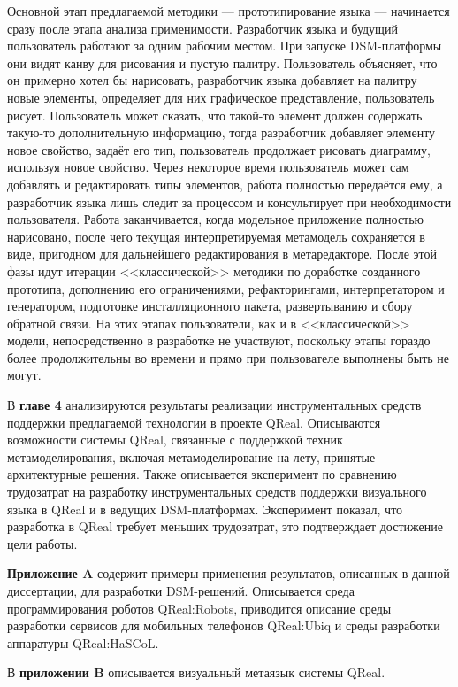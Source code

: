 Основной этап предлагаемой методики --- прототипирование языка --- начинается сразу 
после этапа анализа применимости. Разработчик языка и будущий пользователь работают 
за одним рабочим местом. При запуске DSM-платформы они видят канву для рисования и 
пустую палитру. Пользователь объясняет, что он примерно хотел бы нарисовать, разработчик 
языка добавляет на палитру новые элементы, определяет для них графическое представление, 
пользователь рисует. Пользователь может сказать, что такой-то элемент должен содержать 
такую-то дополнительную информацию, тогда разработчик добавляет элементу новое свойство, 
задаёт его тип, пользователь продолжает рисовать диаграмму, используя новое свойство. 
Через некоторое время пользователь может сам добавлять и 
редактировать типы элементов, работа полностью передаётся ему, а разработчик языка 
лишь следит за процессом и консультирует при необходимости пользователя. Работа заканчивается, 
когда модельное приложение полностью нарисовано, после чего текущая интерпретируемая 
метамодель сохраняется в виде, пригодном для дальнейшего редактирования в метаредакторе. 
После этой фазы идут итерации <<классической>> методики по доработке созданного 
прототипа, дополнению его ограничениями, рефакторингами, интерпретатором и генератором, 
подготовке инсталляционного пакета, развертыванию и сбору обратной связи. На этих этапах 
пользователи, как и в <<классической>> модели, непосредственно в разработке не участвуют, 
поскольку этапы гораздо более продолжительны во времени и прямо при пользователе выполнены 
быть не могут.

В \textbf{главе 4} анализируются результаты реализации инструментальных средств поддержки предлагаемой 
технологии в проекте QReal. Описываются возможности системы QReal, связанные с поддержкой 
техник метамоделирования, включая метамоделирование на лету, принятые архитектурные 
решения. Также описывается эксперимент по сравнению трудозатрат на разработку инструментальных
средств поддержки визуального языка в QReal и в ведущих DSM-платформах. Эксперимент 
показал, что разработка в QReal требует меньших трудозатрат, это подтверждает достижение цели работы.

\textbf{Приложение A} содержит примеры применения результатов, описанных в данной 
диссертации, для разработки DSM-решений. Описывается среда программирования роботов 
QReal:Robots, приводится описание среды разработки сервисов для мобильных телефонов 
QReal:Ubiq и среды разработки аппаратуры QReal:HaSCoL.

В \textbf{приложении B} описывается визуальный метаязык системы QReal.

